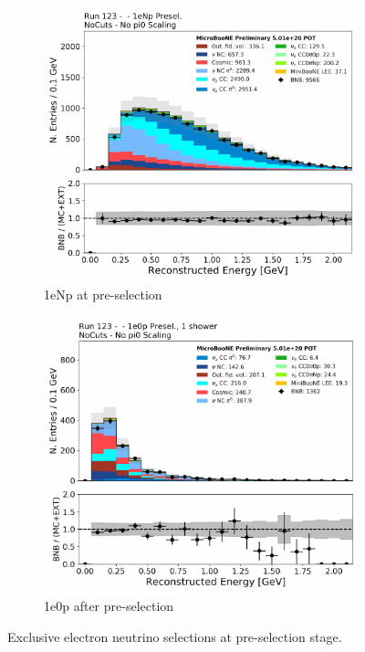 \begin{figure}[H] 
\begin{center}
    \begin{subfigure}[b]{0.45\textwidth}
    \centering
    \includegraphics[width=1.00\textwidth]{Fakedata/set1/Np_presel_recoe.pdf}
    \caption{\label{fig:fakedata:set1:Np_presel_recoe} 1eNp at pre-selection}
    \end{subfigure}
    \begin{subfigure}[b]{0.45\textwidth}
    \centering
    \includegraphics[width=1.00\textwidth]{Fakedata/set1/zp_presel_recoe.pdf}
    \caption{\label{fig:fakedata:set1:2shr0p} 1e0p after pre-selection}
    \end{subfigure}
\caption{\label{fig:fakedata:set1:presel} Exclusive electron neutrino selections at pre-selection stage.}
\end{center}
\end{figure}

